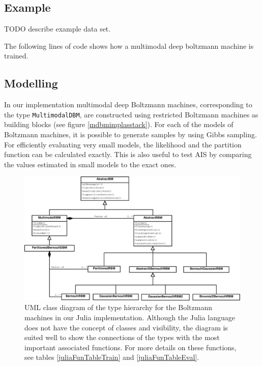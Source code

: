 \documentclass[12pt]{article}
\newcommand{\inlinecode}[1]{\texttt{#1}}
\begin{document}
\subsection{Example}

TODO describe example data set.

The following lines of code shows how a multimodal deep boltzmann machine is trained.

\subsection{Modelling}

In our implementation multimodal deep Boltzmann machines, corresponding to the type \inlinecode{MultimodalDBM}, are constructed using restricted Boltzmann machines as building blocks (see figure \ref{mdbmimplasstack}). For each of the models of Boltzmann machines, it is possible to generate samples by using Gibbs sampling. For efficiently evaluating very small models, the likelihood and the partition function can be calculated exactly. This is also useful to test AIS by comparing the values estimated in small models to the exact ones.

\begin{figure}[h]
   \centering
   \includegraphics[scale=0.25]{images/BoltzmannMachinesDiagram.eps}
   \caption{UML class diagram \citep{uml} of the type hierarchy for the Boltzmann machines in our Julia implementation. Although the Julia language does not have the concept of classes and visibility, the diagram is suited well to show the connections of the types with the most important associated functions.
   For more details on these functions, see tables \ref{juliaFunTableTrain} and \ref{juliaFunTableEval}.}
   \label{umlclassdiagram}
\end{figure}
\end{document}
